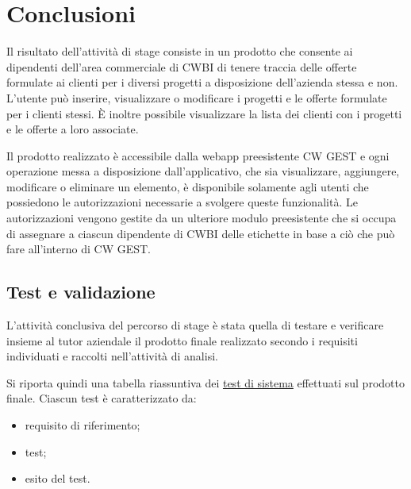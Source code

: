 \chapter{Conclusioni}
\label{cap:conclusioni}


\setlength{\parskip}{3ex}

\noindent Il risultato dell'attività di stage consiste in un prodotto che consente ai dipendenti dell'area commerciale di CWBI di tenere traccia delle offerte formulate ai clienti per i diversi progetti a disposizione dell'azienda stessa e non. L'utente può inserire, visualizzare o modificare i progetti e le offerte formulate per i clienti stessi. È inoltre possibile visualizzare la lista dei clienti con i progetti e le offerte a loro associate. 

\setlength{\parskip}{3ex}

\noindent Il prodotto realizzato è accessibile dalla webapp preesistente CW GEST e ogni operazione messa a disposizione dall'applicativo, che sia visualizzare, aggiungere, modificare o eliminare un elemento, è disponibile solamente agli utenti che possiedono le autorizzazioni necessarie a svolgere queste funzionalità. Le autorizzazioni vengono gestite da un ulteriore modulo preesistente che si occupa di assegnare a ciascun dipendente di CWBI delle etichette in base a ciò che può fare all'interno di CW GEST.


\section{Test e validazione}
L'attività conclusiva del percorso di stage è stata quella di testare e verificare insieme al tutor aziendale il prodotto finale realizzato secondo i requisiti individuati e raccolti nell'attività di analisi.

\setlength{\parskip}{3ex} 

\noindent Si riporta quindi una tabella riassuntiva dei {\hyperref[para:test-definition]{test di sistema}}\glsfirstoccur \; effettuati sul prodotto finale. Ciascun test è caratterizzato da:
\begin{itemize}
\item requisito di riferimento;
\item test;
\item esito del test.
\end{itemize}

